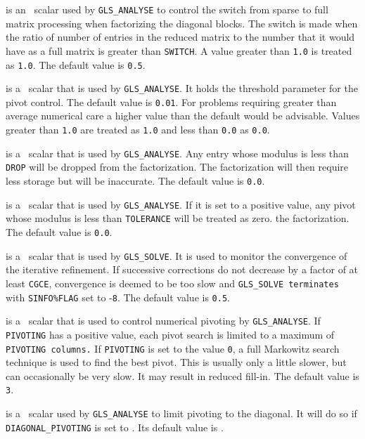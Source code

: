 \documentclass{galahad}
\newcommand{\packagename}{GLS}
\begin{document}
\begin{description}
 is an \realdp\ scalar used by {\tt \packagename\_ANALYSE} to
control
the switch from sparse to full matrix processing when factorizing
the diagonal blocks.  The switch is made when the ratio of
number of entries in the reduced matrix to the number that it would
have as a full matrix is greater than {\tt SWITCH}.
A value greater than {\tt 1.0} is treated as {\tt 1.0}.
The default value is {\tt 0.5}.

 is a \realdp\ scalar that is used by  {\tt \packagename\_ANALYSE}.
It holds the threshold parameter for the pivot control.
The default value is {\tt 0.01}.  For problems requiring greater
than average numerical care a higher value than the default would be
advisable. Values greater than {\tt 1.0} are treated as {\tt 1.0} and
less than {\tt 0.0} as {\tt 0.0}.

 is a \realdp\ scalar that is used by {\tt \packagename\_ANALYSE}.
Any entry whose modulus is less than
{\tt DROP} will be dropped from the factorization.
The factorization will then
require less storage but will be inaccurate.
The default value is {\tt 0.0}.

 is a \realdp\ scalar that is used by {\tt \packagename\_ANALYSE}.
If it is set to a positive value,
any pivot whose modulus is less than
{\tt TOLERANCE} will be treated as zero.
the factorization.
The default value is {\tt 0.0}.

 is a \realdp\ scalar that is used by {\tt \packagename\_SOLVE}.
It is used to
monitor the convergence of the iterative refinement.  If successive
corrections do not decrease by a factor of at least {\tt CGCE},
convergence is deemed to be too slow and {\tt \packagename\_SOLVE
terminates} with {\tt SINFO\%FLAG} set to -{\tt 8}.
The default value is {\tt 0.5}.

 is a \integer\ scalar that is used to control numerical
pivoting by {\tt \packagename\_ANALYSE}. If {\tt PIVOTING} has a positive value,
each pivot search is limited to a maximum of {\tt PIVOTING
columns.}  If {\tt PIVOTING} is set to the value {\tt 0}, a full Markowitz search
technique is used to find the best pivot.  This is usually only a
little slower, but can occasionally be very slow.  It may result in
reduced fill-in. The default value is {\tt 3}.

 is a \logical\ scalar used by
{\tt \packagename\_ANALYSE} to
limit pivoting to the diagonal.  It will do so if {\tt DIAGONAL\_PIVOTING} is set
to \true.  Its default value is \false.


\end{description}
\end{document}
